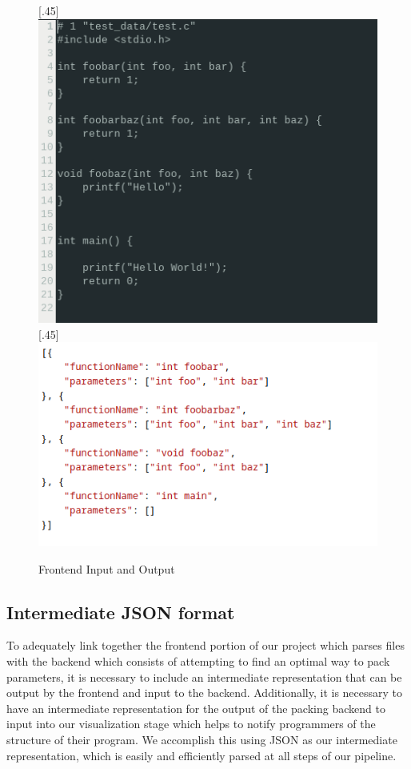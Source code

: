 \documentclass{article}
\begin{document}
\begin{figure}[ht]
    [.45\linewidth]{%
        \includegraphics[width=\linewidth]{im2.png}%
      }%
      \hfill
      [.45\linewidth]{%
        \includegraphics[width=\linewidth]{im3.png}%
      }
      \caption{Frontend Input and Output}
      \label{fig:frontend}
\end{figure}

\subsection{Intermediate JSON format} \label{intermediate_json}

To adequately link together the frontend portion of our project which parses files with the backend which consists of attempting to find an optimal way to pack parameters, it is necessary to include an intermediate representation that can be output by the frontend and input to the backend. Additionally, it is necessary to have an intermediate representation for the output of the packing backend to input into our visualization stage which helps to notify programmers of the structure of their program. We accomplish this using JSON as our intermediate representation, which is easily and efficiently parsed at all steps of our pipeline. 
\end{document}
